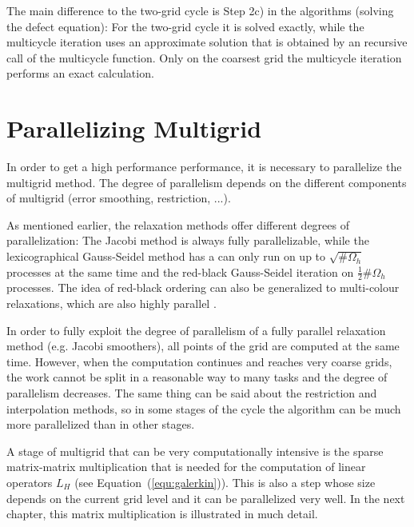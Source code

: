 The main difference to the two-grid cycle is Step 2c) in the algorithms (solving the defect equation): For the two-grid cycle it is solved exactly, while the multicycle iteration uses an approximate solution that is obtained by an recursive call of the multicycle function. Only on the coarsest grid the multicycle iteration performs an exact calculation. 



\section{Parallelizing Multigrid}
In order to get a high performance performance, it is necessary to parallelize the multigrid method. The degree of parallelism depends on the different components of multigrid (error smoothing, restriction, ...). 

As mentioned earlier, the relaxation methods offer different degrees of parallelization: The Jacobi method is always fully parallelizable, while the lexicographical Gauss-Seidel method  has a can only run on up to $\sqrt{\#\Omega_h}$ processes at the same time and the red-black Gauss-Seidel iteration on $\frac{1}{2} \#\Omega_h$ processes. The idea of red-black ordering can also be generalized to multi-colour relaxations, which are also highly parallel \cite{Trottenberg:2000:MUL:374106}.

In order to fully exploit the degree of parallelism of a fully parallel relaxation method (e.g. Jacobi smoothers), all points of the grid are computed at the same time. However, when the computation continues and reaches very coarse grids, the work cannot be split in a reasonable way  to many tasks and the degree of parallelism decreases. The same thing can be said about the restriction and interpolation methods, so in some stages of the cycle the algorithm can be much more parallelized than in other stages.

A stage of multigrid that can be very computationally intensive is the sparse matrix-matrix multiplication that is needed for the computation of linear operators $L_H$ (see Equation~(\ref{equ:galerkin})). This is also a step whose size depends on the current grid level and it can be  parallelized very well. In the next chapter, this matrix multiplication is illustrated in much detail.



